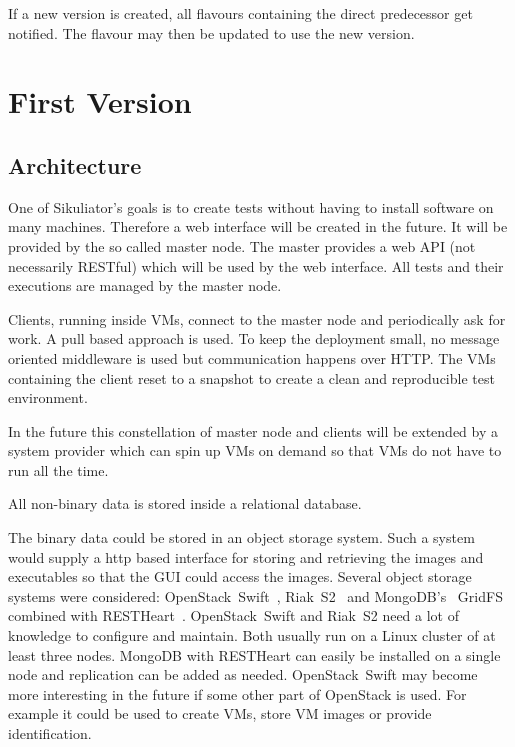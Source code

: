 \documentclass[a4paper,twocolumn,twoside]{article}
\newcommand{\Sik}[0]{Sikuliator}
\begin{document}
If a new version is created, all flavours containing the direct predecessor get notified.
The flavour may then be updated to use the new version.

\section{First Version}
\subsection{Architecture}
One of \Sik{}'s goals is to create tests without having to install software on many machines.
Therefore a web interface will be created in the future.
It will be provided by the so called master node.
The master provides a web API (not necessarily RESTful) which will be used by the web interface.
All tests and their executions are managed by the master node.

Clients, running inside VMs, connect to the master node and periodically ask for work.
A pull based approach is used.
To keep the deployment small, no message oriented middleware is used but communication happens over HTTP.
The VMs containing the client reset to a snapshot to create a clean and reproducible test environment.

In the future this constellation of master node and clients will be extended by a system provider which can spin up VMs on demand so that VMs do not have to run all the time.

All non-binary data is stored inside a relational database.

The binary data could be stored in an object storage system.
Such a system would supply a http based interface for storing and retrieving the images and executables
so that the GUI could access the images.
Several object storage systems were considered: OpenStack~Swift~\cite{OpenStackSwift}, Riak~S2~\cite{RiakS2} and 
MongoDB's~\cite{MongoDB} GridFS~\cite{GridFS} combined with RESTHeart~\cite{RESTHeart}.
OpenStack~Swift and Riak~S2 need a lot of knowledge to configure and maintain.
Both usually run on a Linux cluster of at least three nodes.
MongoDB with RESTHeart can easily be installed on a single node and replication can be added as needed.
OpenStack~Swift may become more interesting in the future if some other part of OpenStack is used.
For example it could be used to create VMs, store VM images or provide identification.
\end{document}
